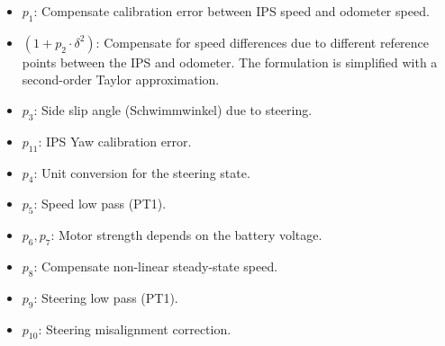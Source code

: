 \begin{itemize}
\item $p_1$: Compensate calibration error between IPS speed and odometer speed. 
\item $(1+p_2 \cdot \delta^2)$: Compensate for speed differences due to different reference points between the IPS and odometer. The formulation is simplified with a second-order Taylor approximation.
\item $p_3$: Side slip angle (Schwimmwinkel) due to steering.
\item $p_{11}$: IPS Yaw calibration error.
\item $p_{4}$: Unit conversion for the steering state.
\item $p_{5}$: Speed low pass (PT1).
\item $p_{6}, p_{7}$: Motor strength depends on the battery voltage.
\item $p_{8}$: Compensate non-linear steady-state speed.
\item $p_{9}$: Steering low pass (PT1).
\item $p_{10}$: Steering misalignment correction.
\end{itemize}